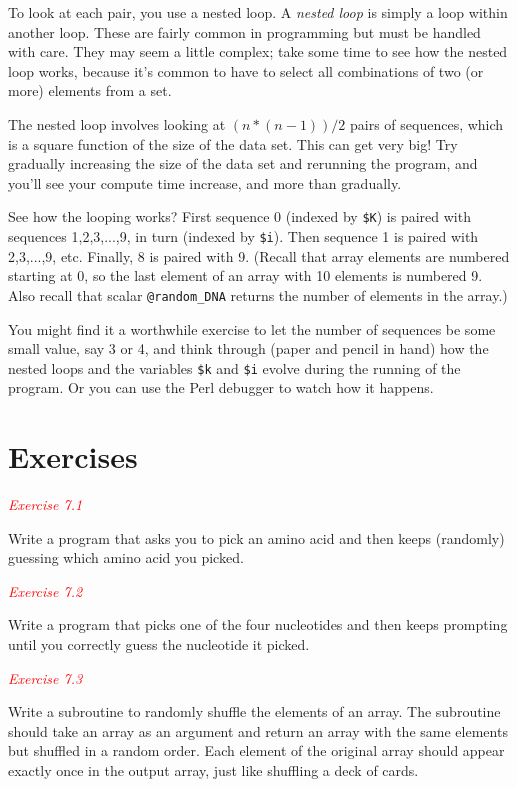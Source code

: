 To look at each pair, you use a nested loop. A \textit{nested loop} is simply a loop within another loop. These are fairly common in programming but must be handled with care. They may seem a little complex; take some time to see how the nested loop works, because it's common to have to select all combinations of two (or more) elements from a set.

The nested loop involves looking at $(n * (n-1)) / 2$ pairs of sequences, which is a square function of the size of the data set. This can get very big! Try gradually increasing the size of the data set and rerunning the program, and you'll see your compute time increase, and more than gradually.

See how the looping works? First sequence 0 (indexed by \verb|$K|) is paired with sequences 1,2,3,...,9, in turn (indexed by \verb|$i|). Then sequence 1 is paired with 2,3,...,9, etc. Finally, 8 is paired with 9. (Recall that array elements are numbered starting at 0, so the last element of an array with 10 elements is numbered 9. Also recall that scalar \verb|@random_DNA| returns the number of elements in the array.)

You might find it a worthwhile exercise to let the number of sequences be some small value, say 3 or 4, and think through (paper and pencil in hand) how the nested loops and the variables \verb|$k| and \verb|$i| evolve during the running of the program. Or you can use the Perl debugger to watch how it happens. 

\section{Exercises}
\textcolor{red}{\textit{Exercise 7.1}}
\begin{adjustwidth}{2em}{}
Write a program that asks you to pick an amino acid and then keeps (randomly) guessing which amino acid you picked. 
\end{adjustwidth}

\textcolor{red}{\textit{Exercise 7.2}}
\begin{adjustwidth}{2em}{}
Write a program that picks one of the four nucleotides and then keeps prompting until you correctly guess the nucleotide it picked.
\end{adjustwidth}

\textcolor{red}{\textit{Exercise 7.3}}
\begin{adjustwidth}{2em}{}
Write a subroutine to randomly shuffle the elements of an array. The subroutine should take an array as an argument and return an array with the same elements but shuffled in a random order. Each element of the original array should appear exactly once in the output array, just like shuffling a deck of cards. 
\end{adjustwidth}


